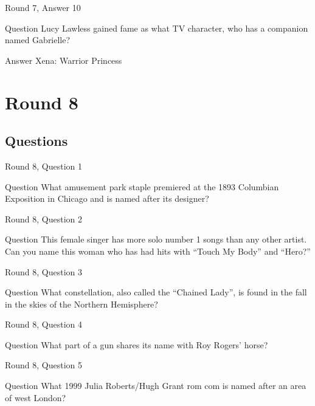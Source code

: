 \documentclass[11pt]{beamer}
\begin{document}
\begin{frame}{Round 7, Answer 10}
\begin{block}{Question}
Lucy Lawless gained fame as what TV character, who has a companion named Gabrielle\@?
\end{block}
\pause{}
\begin{block}{Answer}
Xena: Warrior Princess
\end{block}
\end{frame}
    

\section{Round 8}
    
\subsection{Questions}

\begin{frame}{Round 8, Question 1}
\begin{block}{Question}
What amusement park staple premiered at the 1893 Columbian Exposition in Chicago and is named after its designer\@?
\end{block}
\end{frame}
    

\begin{frame}{Round 8, Question 2}
\begin{block}{Question}
This female singer has more solo number 1 songs than any other artist. Can you name this woman who has had hits with ``Touch My Body'' and ``Hero?''
\end{block}
\end{frame}
    

\begin{frame}{Round 8, Question 3}
\begin{block}{Question}
What constellation, also called the ``Chained Lady'', is found in the fall in the skies of the Northern Hemisphere\@?
\end{block}
\end{frame}
    

\begin{frame}{Round 8, Question 4}
\begin{block}{Question}
What part of a gun shares its name with Roy Rogers' horse\@?
\end{block}
\end{frame}
    

\begin{frame}{Round 8, Question 5}
\begin{block}{Question}
What 1999 Julia Roberts/Hugh Grant rom com is named after an area of west London\@?
\end{block}
\end{frame}
    
\end{document}
